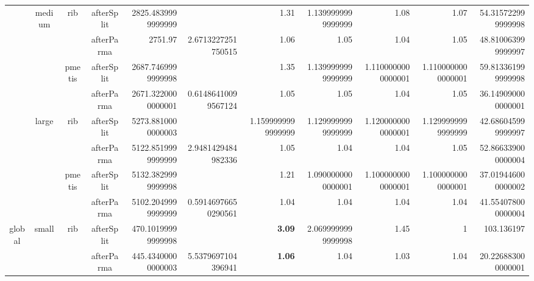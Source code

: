 \documentclass{beamer}
\begin{document}
\begin{frame}
\begin{tabular}{ c c c c N{4}{2} N{4}{2} N{1}{2} N{1}{2} N{1}{2} N{1}{2} N{3}{2} }
           & medium  & rib    & afterSplit & 2825.4839999999999 &                     & 1.31                        & 1.1399999999999999          & 1.08                        & 1.07                        & 54.315722999999998\\
           &         &        & afterParma & 2751.97            & 2.6713227251750515  & 1.06                        & 1.05                        & 1.04                        & 1.05                        & 48.810063999999997\\
           &         & pmetis & afterSplit & 2687.7469999999998 &                     & 1.35                        & 1.1399999999999999          & 1.1100000000000001          & 1.1100000000000001          & 59.813361999999998\\
           &         &        & afterParma & 2671.3220000000001 & 0.61486410099567124 & 1.05                        & 1.05                        & 1.04                        & 1.05                        & 36.149090000000001\\
           & large   & rib    & afterSplit & 5273.8810000000003 &                     & 1.1599999999999999          & 1.1299999999999999          & 1.1200000000000001          & 1.1299999999999999          & 42.686045999999997\\
           &         &        & afterParma & 5122.8519999999999 & 2.9481429484982336  & 1.05                        & 1.04                        & 1.04                        & 1.05                        & 52.866339000000004\\
           &         & pmetis & afterSplit & 5132.3829999999998 &                     & 1.21                        & 1.0900000000000001          & 1.1000000000000001          & 1.1000000000000001          & 37.019446000000002\\
           &         &        & afterParma & 5102.2049999999999 & 0.59146976650290561 & 1.04                        & 1.04                        & 1.04                        & 1.04                        & 41.554078000000004\\
    global & small   & rib    & afterSplit & 470.10199999999998 &                     & {\textbf{3.09}}             & 2.0699999999999998          & 1.45                        & 1                           & 103.136197\\
           &         &        & afterParma & 445.43400000000003 & 5.5379697104396941  & {\textbf{1.06}}             & 1.04                        & 1.03                        & 1.04                        & 20.226883000000001\\

\end{tabular}
\end{frame}
\end{document}
